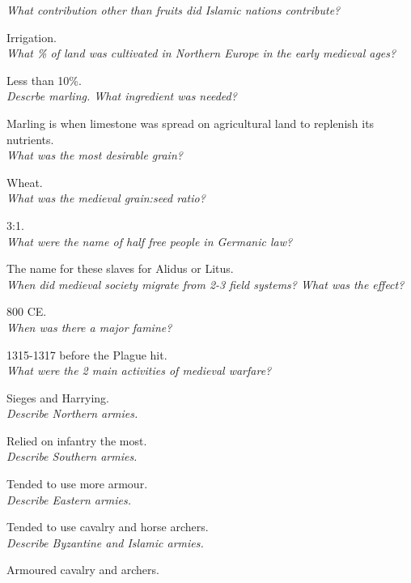 \documentclass[12pt]{article}
\begin{document}
\textit{What contribution other than fruits did Islamic nations contribute?}

Irrigation.\\

\textit{What \% of land was cultivated in Northern Europe in the early medieval ages?}

Less than 10\%.\\

\textit{Descrbe marling. What ingredient was needed?}

Marling is when limestone was spread on agricultural land to replenish its nutrients.\\


\textit{What was the most desirable grain?}

Wheat.\\

\textit{What was the medieval grain:seed ratio?}

3:1.\\

\textit{What were the name of half free people in Germanic law?}

The name for these slaves for Alidus or Litus.\\

\textit{When did medieval society migrate from 2-3 field systems? What was the effect?}

800 CE.\\

\textit{When was there a major famine?}

1315-1317 before the Plague hit.\\

\textit{What were the 2 main activities of medieval warfare?}

Sieges and Harrying.\\

\textit{Describe Northern armies.}

Relied on infantry the most.\\

\textit{Describe Southern armies.}

Tended to use more armour.\\

\textit{Describe Eastern armies.}

Tended to use cavalry and horse archers.\\

\textit{Describe Byzantine and Islamic armies.}

Armoured cavalry and archers.\\
\end{document}
